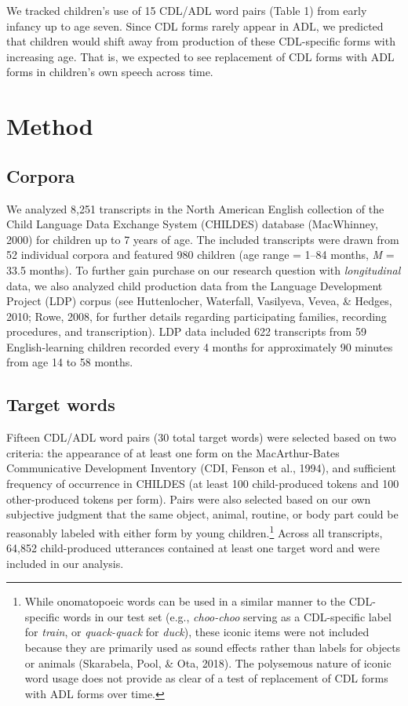 \documentclass[10pt, letterpaper]{article}
\begin{document}
We tracked children's use of 15 CDL/ADL word pairs (Table 1) from early
infancy up to age seven. Since CDL forms rarely appear in ADL, we
predicted that children would shift away from production of these
CDL-specific forms with increasing age. That is, we expected to see
replacement of CDL forms with ADL forms in children's own speech across
time.

\hypertarget{method}{%
\section{Method}\label{method}}

\hypertarget{corpora}{%
\subsection{Corpora}\label{corpora}}

We analyzed 8,251 transcripts in the North American English collection
of the Child Language Data Exchange System (CHILDES) database
(MacWhinney, 2000) for children up to 7 years of age. The included
transcripts were drawn from 52 individual corpora and featured 980
children (age range = 1--84 months, \emph{M} = 33.5 months). To further
gain purchase on our research question with \emph{longitudinal} data, we
also analyzed child production data from the Language Development
Project (LDP) corpus (see Huttenlocher, Waterfall, Vasilyeva, Vevea, \&
Hedges, 2010; Rowe, 2008, for further details regarding participating
families, recording procedures, and transcription). LDP data included
622 transcripts from 59 English-learning children recorded every 4
months for approximately 90 minutes from age 14 to 58 months.

\hypertarget{target-words}{%
\subsection{Target words}\label{target-words}}

Fifteen CDL/ADL word pairs (30 total target words) were selected based
on two criteria: the appearance of at least one form on the
MacArthur-Bates Communicative Development Inventory (CDI, Fenson et al.,
1994), and sufficient frequency of occurrence in CHILDES (at least 100
child-produced tokens and 100 other-produced tokens per form). Pairs
were also selected based on our own subjective judgment that the same
object, animal, routine, or body part could be reasonably labeled with
either form by young children.\footnote{While onomatopoeic words can be
  used in a similar manner to the CDL-specific words in our test set
  (e.g., \emph{choo-choo} serving as a CDL-specific label for
  \emph{train}, or \emph{quack-quack} for \emph{duck}), these iconic
  items were not included because they are primarily used as sound
  effects rather than labels for objects or animals (Skarabela, Pool, \&
  Ota, 2018). The polysemous nature of iconic word usage does not
  provide as clear of a test of replacement of CDL forms with ADL forms
  over time.} Across all transcripts, 64,852 child-produced utterances
contained at least one target word and were included in our analysis.
\end{document}
